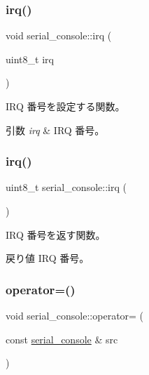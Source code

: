 \subsubsection{\texorpdfstring{irq()}{irq()}\hspace{0.1cm}{\footnotesize\ttfamily [1/2]}}
{\footnotesize\ttfamily void serial\+\_\+console\+::irq (\begin{DoxyParamCaption}\item[{uint8\+\_\+t}]{irq }\end{DoxyParamCaption})}

I\+RQ 番号を設定する関数。 
\begin{DoxyParams}{引数}
{\em irq} & I\+RQ 番号。 \\
\hline
\end{DoxyParams}
\hypertarget{classserial__console_a286ec03d4c3b6d35c29ac65c237741cd}{}\label{classserial__console_a286ec03d4c3b6d35c29ac65c237741cd} 
\subsubsection{\texorpdfstring{irq()}{irq()}\hspace{0.1cm}{\footnotesize\ttfamily [2/2]}}
{\footnotesize\ttfamily uint8\+\_\+t serial\+\_\+console\+::irq (\begin{DoxyParamCaption}{ }\end{DoxyParamCaption})}

I\+RQ 番号を返す関数。 \begin{DoxyReturn}{戻り値}
I\+RQ 番号。 
\end{DoxyReturn}
\hypertarget{classserial__console_a3c252fd567fb159b89225b86215da61f}{}\label{classserial__console_a3c252fd567fb159b89225b86215da61f} 
\subsubsection{\texorpdfstring{operator=()}{operator=()}\hspace{0.1cm}{\footnotesize\ttfamily [1/2]}}
{\footnotesize\ttfamily void serial\+\_\+console\+::operator= (\begin{DoxyParamCaption}\item[{const \hyperlink{classserial__console}{serial\+\_\+console} \&}]{src }\end{DoxyParamCaption})\hspace{0.3cm}{\ttfamily [delete]}}


